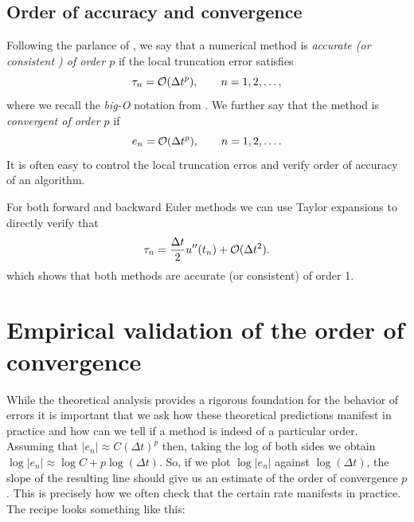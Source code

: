 \subsection{Order of accuracy and convergence} 
Following the parlance of \cite{ascher}, we say that a 
numerical method is {\it accurate (or  consistent )
 of order $p$} if the local truncation error satisfies 
 \begin{equation*}
    \tau_n = \mathcal{O}(\Delta t^p), \qquad n = 1, 2, \dots,
 \end{equation*}
 where we recall the {\it big-O} notation from 
 . We further say that the method is 
 {\it convergent of order $p$} if 
 \begin{equation*}
    e_n = \mathcal{O}(\Delta t^p), \qquad n = 1, 2, \dots.
 \end{equation*}
 It is often easy to control the local truncation erros and 
 verify order of accuracy of an algorithm. 
 
 \begin{example}\label{ex:euler_first_order_accuracy}    
  For both forward and 
 backward Euler methods we can use Taylor expansions to 
 directly verify that 
 \begin{equation*}
    \tau_n = \frac{\Delta t}{2} u''(t_n) + \mathcal{O}(\Delta t^2).
 \end{equation*}
 which shows that both methods are accurate (or consistent) 
 of order 1.
\end{example}



\section{Empirical validation of the order of convergence}

While the theoretical analysis provides a rigorous foundation 
for the behavior of errors it is important that we ask how 
these theoretical predictions manifest in practice and 
how can we tell if a method is indeed of a particular order. 
Assuming that $|e_n| \approx C (\Delta t)^p$ then, taking the 
log of both sides we obtain 
$\log |e_n| \approx \log C + p \log (\Delta t).$ So, if we plot 
$\log |e_n|$ against $\log (\Delta t)$, the slope of the resulting 
line should give us an estimate of the order of convergence $p$.
This is precisely how we often check that the certain rate 
manifests in practice. The recipe looks something like this: 

